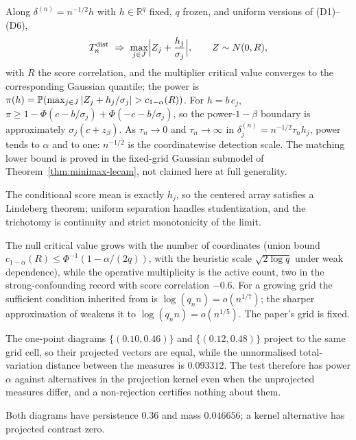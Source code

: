 \begin{theorem}
\label{thm:dist-local}
Along $\delta^{(n)}=n^{-1/2}h$ with $h\in\mathbb R^q$ fixed, $q$ frozen, and uniform versions of (D1)--(D6),
\[
T_n^{\mathrm{dist}}\ \Rightarrow\ \max_{j\in J}\Bigl|Z_j+\frac{h_j}{\sigma_j}\Bigr|,\qquad Z\sim N(0,R),
\]
with $R$ the score correlation, and the multiplier critical value converges to the corresponding Gaussian quantile; the power is $\pi(h)=\Prob(\max_{j\in J}|Z_j+h_j/\sigma_j|>c_{1-\alpha}(R))$. For $h=b\,e_j$, $\pi\ge1-\Phi(c-b/\sigma_j)+\Phi(-c-b/\sigma_j)$, so the power-$1-\beta$ boundary is approximately $\sigma_j(c+z_\beta)$. As $\tau_n\to0$ and $\tau_n\to\infty$ in $\delta^{(n)}_j=n^{-1/2}\tau_nh_j$, power tends to $\alpha$ and to one: $n^{-1/2}$ is the coordinatewise detection scale. The matching lower bound is proved in the fixed-grid Gaussian submodel of Theorem~\ref{thm:minimax-lecam}, not claimed here at full generality.
\end{theorem}
The conditional score mean is exactly $h_j$, so the centered array satisfies a Lindeberg theorem; uniform separation handles studentization, and the trichotomy is continuity and strict monotonicity of the limit.

The null critical value grows with the number of coordinates (union bound $c_{1-\alpha}(R)\le\Phi^{-1}(1-\alpha/(2q))$, with the heuristic scale $\sqrt{2\log q}$ under weak dependence), while the operative multiplicity is the active count, two in the strong-confounding record with score correlation $-0.6$. For a growing grid the sufficient condition inherited from \citet{cck_2013} is $\log(q_nn)=o(n^{1/7})$; the sharper approximation of \citet{cckk_improved_2022} weakens it to $\log(q_nn)=o(n^{1/5})$. The paper's grid is fixed.

\begin{lemma}
\label{lem:dist-witness}
The one-point diagrams $\{(0.10,0.46)\}$ and $\{(0.12,0.48)\}$ project to the same grid cell, so their projected vectors are equal, while the unnormalised total-variation distance between the measures is $0.093312$. The test therefore has power $\alpha$ against alternatives in the projection kernel even when the unprojected measures differ, and a non-rejection certifies nothing about them.
\end{lemma}
Both diagrams have persistence $0.36$ and mass $0.046656$; a kernel alternative has projected contrast zero.

